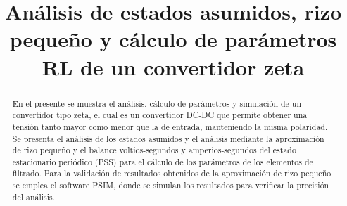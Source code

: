 \documentclass[conference]{IEEEtran}
\begin{document}
%
\title{Análisis de estados asumidos, rizo pequeño y cálculo de parámetros RL de un convertidor zeta}

\author{
}

\maketitle

\thispagestyle{firststyle}
\renewcommand{\headrulewidth}{0in}
\pagestyle{empty}

\pagestyle{fancy}
\chead{\fontsize{8}{10} \selectfont \textit{} }


\begin{abstract}
	En el presente se muestra el análisis, cálculo de parámetros y simulación de un convertidor tipo zeta, el cual es un convertidor DC-DC que permite obtener una tensión tanto mayor como menor que la de entrada, manteniendo la misma polaridad. Se presenta el análisis de los estados asumidos y el análisis mediante la aproximación de  rizo pequeño  y el balance voltios-segundos y amperios-segundos del estado estacionario periódico (PSS) para el cálculo de los parámetros de los elementos de filtrado. Para la validación de resultados obtenidos de la aproximación de rizo pequeño se emplea el software PSIM, donde se simulan los resultados para verificar la precisión del análisis.
\end{abstract}

\end{document}
